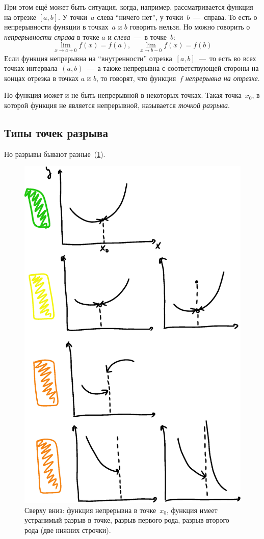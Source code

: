 \documentclass[a4paper,12pt]{article}
\begin{document}
  При этом ещё может быть ситуация, когда, например, рассматривается функция на отрезке $[a, b]$.
  У точки~$a$ слева ``ничего нет'', у точки~$b$~---~справа.
  То есть о непрерывности функции в точках~$a$ и $b$ говорить нельзя.
  Но можно говорить о \emph{непрерывности справа} в точке $a$ и \emph{слева}~---~в точке~$b$:
  \[
    \lim_{x \to a + 0} f(x) = f(a),\quad \lim_{x \to b - 0} f(x) = f(b)
  \]
  Если функция непрерывна на ``внутренности'' отрезка~$[a, b]$~---~то есть во всех точках интервала~$(a, b)$~---~а также непрерывна с соответствующей стороны на концах отрезка в точках $a$ и $b$, то говорят, что функция~$f$ \emph{непрерывна на отрезке}.

  Но функция может и не быть непрерывной в некоторых точках.
  Такая точка~$x_0$, в которой функция не является непрерывной, называется \emph{точкой разрыва}.
  
  \subsection{Типы точек разрыва}
  Но разрывы бывают разные~(\ref{fig:bad-guys}).
    
  \begin{figure}[ht]
    \centering
    \includegraphics[width=0.6\linewidth]{images/bad-guys}
    
    \caption{
      Сверху вниз: функция непрерывна в точке~$x_0$, функция имеет устранимый разрыв в точке, разрыв первого рода, разрыв второго рода (две нижних строчки).
    }
    \label{fig:bad-guys}
  \end{figure}
\end{document}
